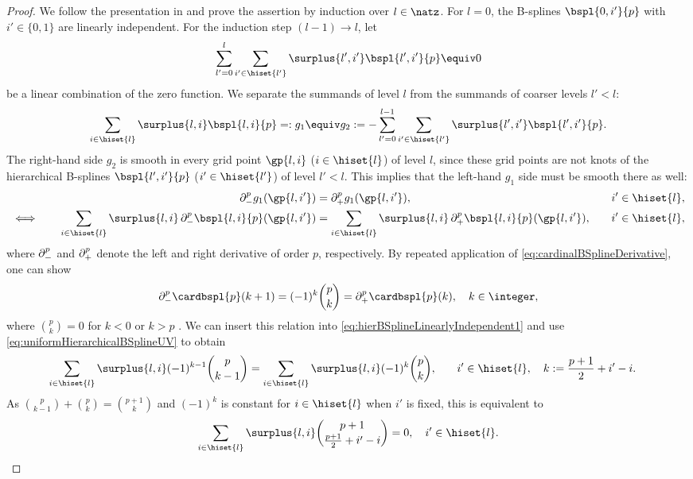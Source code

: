 \begin{proof}
  We follow the presentation in \cite{Valentin16Hierarchical} and
  prove the assertion by induction over $l \in \natz$.
  For $l = 0$, the B-splines $\bspl{0,i'}{p}$ with $i' \in \{0, 1\}$
  are linearly independent.
  For the induction step $(l-1) \to l$, let
  \begin{equation}
    \sum_{l'=0}^l \sum_{i' \in \hiset{l'}} \surplus{l',i'} \bspl{l',i'}{p}
    \equiv 0
  \end{equation}
  be a linear combination of the zero function.
  We separate the summands of level $l$
  from the summands of coarser levels $l' < l$:
  \begin{equation}
    \label{eq:hierBSplineLinearlyIndependent3}
    \sum_{i \in \hiset{l}} \surplus{l,i} \bspl{l,i}{p}
    =: g_1 \equiv g_2 :=
    -\sum_{l'=0}^{l-1} \sum_{i' \in \hiset{l'}} \surplus{l',i'} \bspl{l',i'}{p}.
  \end{equation}
  The right-hand side $g_2$ is smooth in every grid point
  $\gp{l,i}$ ($i \in \hiset{l}$) of level $l$,
  since these grid points are not knots of the hierarchical B-splines
  $\bspl{l',i'}{p}$ ($i' \in \hiset{l'}$) of level $l' < l$.
  This implies that the left-hand $g_1$ side must be smooth there as well:
  \begin{alignat}{3}
    &&
    \partialdiff_-^p g_1(\gp{l,i'})
    &= \partialdiff_+^p g_1(\gp{l,i'}),\quad
    &&i' \in \hiset{l},\\
    \label{eq:hierBSplineLinearlyIndependent1}
    \iff\quad&&
    \sum_{i \in \hiset{l}} \surplus{l,i}
    \partialdiff_-^p \bspl{l,i}{p}(\gp{l,i'})
    &= \sum_{i \in \hiset{l}} \surplus{l,i}
    \partialdiff_+^p \bspl{l,i}{p}(\gp{l,i'}),\quad
    &&i' \in \hiset{l},
  \end{alignat}
  where $\mathop{}\!\partial_-^p$ and $\mathop{}\!\partial_+^p$ denote the left and right
  derivative of order $p$, respectively.
  By repeated application of \eqref{eq:cardinalBSplineDerivative},
  one can show
  \begin{equation}
    \partialdiff_-^p \cardbspl{p}(k + 1)
    = (-1)^k \binom{p}{k}
    = \partialdiff_+^p \cardbspl{p}(k),\quad
    k \in \integer,
  \end{equation}
  where $\binom{p}{k} = 0$ for $k < 0$ or $k > p$
  \cite{Hoellig13Approximation}.
  We can insert this relation into
  \eqref{eq:hierBSplineLinearlyIndependent1}
  and use \eqref{eq:uniformHierarchicalBSplineUV} to obtain
  \begin{alignat}{2}
    \sum_{i \in \hiset{l}} \surplus{l,i} (-1)^{k-1} \binom{p}{k-1}
    &= \sum_{i \in \hiset{l}} \surplus{l,i} (-1)^k \binom{p}{k},\quad
    &&i' \in \hiset{l},\quad
    k := \frac{p+1}{2} + i' - i.
  \end{alignat}
  As $\binom{p}{k-1} + \binom{p}{k} = \binom{p+1}{k}$
  and $(-1)^k$ is constant for $i \in \hiset{l}$ when $i'$ is fixed,
  this is equivalent to
  \begin{equation}
    \label{eq:hierBSplineLinearlyIndependent2}
    \sum_{i \in \hiset{l}} \surplus{l,i}
    \binom{p+1}{\frac{p+1}{2} + i' - i} = 0,\quad
    i' \in \hiset{l}.
  \end{equation}
  

\end{proof}
